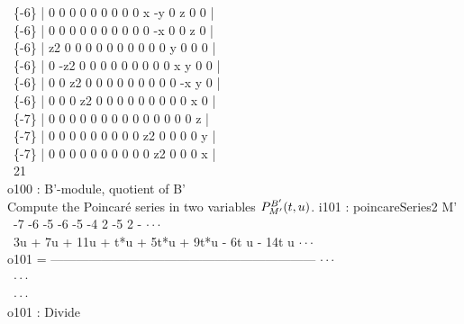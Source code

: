 \begin{sExample}
\                \{-6\} | 0  0   0  0  0  0 0 0  0 x  -y 0 z  0 0 |\\
\                \{-6\} | 0  0   0  0  0  0 0 0  0 0  -x 0 0  z 0 |\\
\                \{-6\} | z2 0   0  0  0  0 0 0  0 0  0  y 0  0 0 |\\
\                \{-6\} | 0  -z2 0  0  0  0 0 0  0 0  0  x y  0 0 |\\
\                \{-6\} | 0  0   z2 0  0  0 0 0  0 0  0  0 -x y 0 |\\
\                \{-6\} | 0  0   0  z2 0  0 0 0  0 0  0  0 0  x 0 |\\
\                \{-7\} | 0  0   0  0  0  0 0 0  0 0  0  0 0  0 z |\\
\                \{-7\} | 0  0   0  0  0  0 0 0  0 z2 0  0 0  0 y |\\
\                \{-7\} | 0  0   0  0  0  0 0 0  0 0  z2 0 0  0 x |\\
\emptyLine
\                                21\\
o100 : B'-module, quotient of B'\\
\endOutput
Compute the Poincar\'e series in two variables ${P}^{B'}_{M'}(t,u)$.
\beginOutput
i101 : poincareSeries2 M'\\
\emptyLine
\         -7     -6      -5      -6       -5       -4     2 -5      2 - $\cdot\cdot\cdot$\\
\       3u   + 7u   + 11u   + t*u   + 5t*u   + 9t*u   - 6t u   - 14t u  $\cdot\cdot\cdot$\\
o101 = --------------------------------------------------------------- $\cdot\cdot\cdot$\\
\                                                                       $\cdot\cdot\cdot$\\
\                                                                       $\cdot\cdot\cdot$\\
\emptyLine
o101 : Divide\\
\endOutput
\end{sExample}

